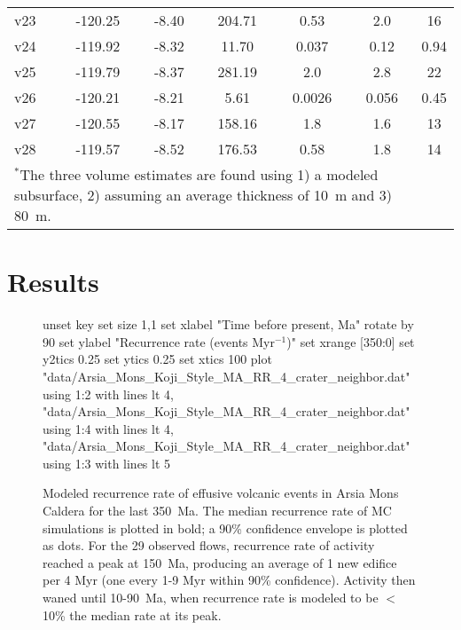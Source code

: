 \begin{table}[h!]
\begin{tabular}{l c c c c c c}
			v23 & -120.25 & -8.40 & 204.71 & 0.53 & 2.0 & 16\\
			v24 & -119.92 & -8.32 & 11.70 & 0.037 & 0.12 & 0.94\\
			v25 & -119.79 & -8.37 & 281.19 & 2.0 & 2.8 & 22\\
			v26 & -120.21 & -8.21 & 5.61 & 0.0026 & 0.056 & 0.45\\
			v27 & -120.55 & -8.17 & 158.16 & 1.8 & 1.6 & 13\\
			v28 & -119.57 & -8.52 & 176.53 & 0.58 & 1.8 & 14\\
		\bottomrule
		\multicolumn{6}{p{0.65\linewidth}}{$^*$The three volume estimates are found using 1) a modeled subsurface, 2) assuming an average thickness of 10~m and 3) 80~m.}
	\end{tabular}
	\label{tab_morphdatabase}
	\end{table}

\section{Results}

	\begin{figure}[h!]
		\centering
		\begin{gnuplot}[terminal=latex, terminaloptions=rotate]
			unset key
			set size 1,1
			set xlabel "Time before present, Ma" rotate by 90
			set ylabel "Recurrence rate (events Myr$^{-1}$)"
			set xrange [350:0]
			set y2tics 0.25
			set ytics 0.25
			set xtics 100
			plot "data/Arsia_Mons_Koji_Style_MA_RR_4_crater_neighbor.dat" using 1:2 with lines lt 4, "data/Arsia_Mons_Koji_Style_MA_RR_4_crater_neighbor.dat" using 1:4 with lines lt 4, "data/Arsia_Mons_Koji_Style_MA_RR_4_crater_neighbor.dat" using 1:3 with lines lt 5
		\end{gnuplot}
		\caption[Modeled recurrence rate of effusive volcanic events in Arsia Mons Caldera for the last 350~Ma]{Modeled recurrence rate of effusive volcanic events in Arsia Mons Caldera for the last 350~Ma. The median recurrence rate of MC simulations is plotted in bold; a 90\% confidence envelope is plotted as dots. For the 29 observed flows, recurrence rate of activity reached a peak at 150~Ma, producing an average of 1 new edifice per 4 Myr (one every 1-9 Myr within 90\% confidence). Activity then waned until 10-90~Ma, when recurrence rate is modeled to be $<$10\% the median rate at its peak.}
		\label{fig_VERRMRR}
	\end{figure}
	
